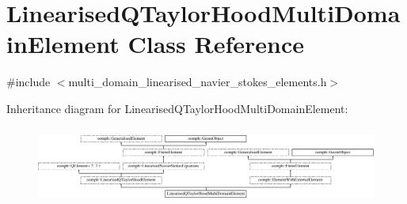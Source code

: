 \hypertarget{classLinearisedQTaylorHoodMultiDomainElement}{}\section{Linearised\+Q\+Taylor\+Hood\+Multi\+Domain\+Element Class Reference}
\label{classLinearisedQTaylorHoodMultiDomainElement}


{\ttfamily \#include $<$multi\+\_\+domain\+\_\+linearised\+\_\+navier\+\_\+stokes\+\_\+elements.\+h$>$}

Inheritance diagram for Linearised\+Q\+Taylor\+Hood\+Multi\+Domain\+Element\+:\begin{figure}[H]
\begin{center}
\leavevmode
\includegraphics[height=2.611940cm]{classLinearisedQTaylorHoodMultiDomainElement}
\end{center}
\end{figure}
